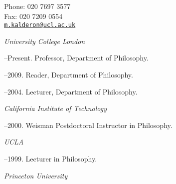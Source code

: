 \documentclass[11pt]{article}
\makeatletter
\def\myemail{m.kalderon@ucl.ac.uk}
\def\myweb{http://markelikalderon.com}
\def\myphone{020 7697 3577}
\def\myfax{020 7209 0554}
\makeatother
\begin{document}
\begin{minipage}[t]{2.95in}
  
\end{minipage}
\hfill     
\hfill
\begin{minipage}[t]{1.7in}
  \flushright \footnotesize Phone: \myphone \\ 
  Fax: \myfax  \\ 
  {\scriptsize  \texttt{\href{mailto:\myemail}{\myemail}}} \\
\end{minipage}


\medskip

\reversemarginpar

\medskip       

\medskip
{}

\noindent\emph{University College London \vspace{0.01in}}

--Present. Professor, Department of Philosophy.      

--2009. Reader, Department of Philosophy.

--2004. Lecturer, Department of Philosophy.

\medskip
\noindent\emph{California Institute of Technology \vspace{0.01in}}

--2000. Weisman Postdoctoral Instructor in Philosophy.

\medskip
\noindent\emph{UCLA \vspace{0.01in}}

--1999. Lecturer in Philosophy.

\medskip
\noindent\emph{Princeton University \vspace{0.01in}}
\end{document}
